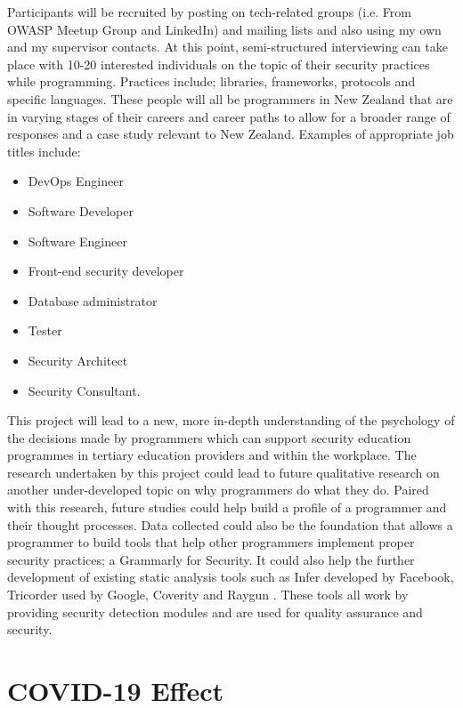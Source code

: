 \newline
\par Participants will be recruited by posting on tech-related groups (i.e. From OWASP Meetup Group and LinkedIn) and mailing lists and also using my own and my supervisor contacts. At this point, semi-structured interviewing can take place with 10-20 interested individuals on the topic of their security practices while programming. Practices include; libraries, frameworks, protocols and specific languages. These people will all be programmers in New Zealand that are in varying stages of their careers and career paths to allow for a broader range of responses and a case study relevant to New Zealand. Examples of appropriate job titles include:
\begin{itemize}
\item  DevOps Engineer
\item Software Developer
\item Software Engineer
\item Front-end security developer
\item Database administrator
\item Tester
\item Security Architect
\item Security Consultant.
\end{itemize}

\par This project will lead to a new, more in-depth understanding of the psychology of the decisions made by programmers which can support security education programmes in tertiary education providers and within the workplace. The research undertaken by this project could lead to future qualitative research on another under-developed topic on why programmers do what they do. Paired with this research, future studies could help build a profile of a programmer and their thought processes. Data collected could also be the foundation that allows a programmer to build tools that help other programmers implement proper security practices; a Grammarly for Security. It could also help the further development of existing static analysis tools such as Infer developed by Facebook, Tricorder used by Google, Coverity and Raygun \cite{infer, tri, coverity, raygun}. These tools all work by providing security detection modules and are used for quality assurance and security. 

\section{COVID-19 Effect}

